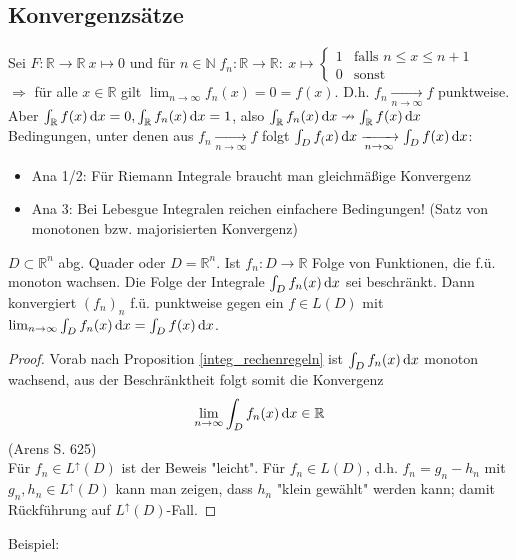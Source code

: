 \subsection{Konvergenzsätze}
Sei $F:\mathbb{R}\to\mathbb{R}\ x\mapsto 0$ und für $n\in\mathbb{N}\; f_n\colon\mathbb{R}\to\mathbb{R}\colon\ x\mapsto\left\{\begin{matrix}
	1 & \text{falls }n\leq x\leq n+1\\
	0 & \text{sonst}
\end{matrix}\right.$\\
$\Rightarrow$ für alle $x\in\mathbb{R}$ gilt $\lim_{n\to\infty}f_n(x)=0=f(x)$. D.h. $f_n\xrightarrow[n\to\infty]{}f$ punktweise.\\
Aber $\int_{\mathbb{R}} f(x) \,\text{d}x = 0, \int_{\mathbb{R}} f_n(x) \,\text{d}x = 1$, also $\int_{\mathbb{R}} f_n(x) \,\text{d}x\nrightarrow\int_{\mathbb{R}} f(x) \,\text{d}x$\\
Bedingungen, unter denen aus $f_n\xrightarrow[n\to\infty]{}f$ folgt $\int_{D} f_(x) \,\text{d}x\xrightarrow[n\to\infty]{}\int_{D} f(x) \,\text{d}x$:\\
\begin{itemize}
    \item Ana 1/2: Für Riemann Integrale braucht man gleichmäßige Konvergenz
    \item Ana 3: Bei Lebesgue Integralen reichen einfachere Bedingungen! (Satz von monotonen bzw. majorisierten Konvergenz)
\end{itemize}
\begin{satz}
    $D\subset\mathbb{R}^n$ abg. Quader oder $D=\mathbb{R}^n$. Ist $f_n\colon D\to\mathbb{R}$ Folge von Funktionen, die f.ü. monoton wachsen. Die Folge der Integrale $\int_{D} f_n(x) \,\text{d}x$ sei beschränkt. Dann konvergiert $(f_n)_n$ f.ü. punktweise gegen ein $f\in L(D)$ mit $\lim_{n\to\infty}\int_{D} f_n(x) \,\text{d}x=\int_{D} f(x) \,\text{d}x$.
\end{satz}
\begin{proof}
    Vorab nach Proposition \ref{integ_rechenregeln} ist $\int_{D} {f_n}(x) \,\text{d}x$ monoton wachsend, aus der Beschränktheit folgt somit die Konvergenz 
    \[
        \lim_{n\to\infty}\int_{D} f_n(x) \,\text{d}x\in\mathbb{R}
    \]
    (Arens S. 625)\\
    Für $f_n\in L^\uparrow(D)$ ist der Beweis "leicht". Für $f_n\in L(D)$, d.h. $f_n=g_n-h_n$ mit $g_n,h_n\in L^\uparrow(D)$ kann man zeigen, dass $h_n$ "klein gewählt" werden kann; damit Rückführung auf $L^\uparrow(D)$-Fall.
\end{proof}
Beispiel:\\
